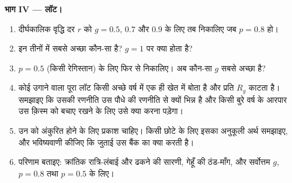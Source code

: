 \begin{problem}
\medskip
\noindent\textbf{भाग IV ---  लॉट।}
\begin{enumerate}[resume]
  \item दीर्घकालिक वृद्धि दर $r$ को $g = 0.5$, $0.7$ और $0.9$ के लिए
        तब निकालिए जब $p = 0.8$ हो।
  \item इन तीनों में सबसे अच्छा कौन-सा है? $g = 1$ पर क्या होता है?
  \item $p = 0.5$ (किसी रेगिस्तान) के लिए फिर से निकालिए। अब कौन-सा
        $g$ सबसे अच्छा है?
  \item कोई उगाने वाला पूरा लॉट किसी अच्छे वर्ष में एक ही खेत में बोता
        है और प्रति  $R_g$ काटता है। समझाइए कि उसकी रणनीति उस पौधे
        की रणनीति से क्यों भिन्न है और किसी बुरे वर्ष के आरपार उस
        क़िस्म को बचाए रखने के लिए उसे क्या करना पड़ेगा।
  \item उन  को अंकुरित होने के लिए प्रकाश चाहिए। किसी छोटे  के
        लिए इसका अनुकूली अर्थ समझाइए, और भविष्यवाणी कीजिए कि जुताई
        उस  बैंक का क्या करती है।
  \item परिणाम बताइए: क्रांतिक रात्रि-लंबाई और ढकने की
        सारणी, गेहूँ की ठंड-माँग, और सर्वोत्तम $g$, $p = 0.8$ तथा
        $p = 0.5$ के लिए।
\end{enumerate}
\end{problem}
